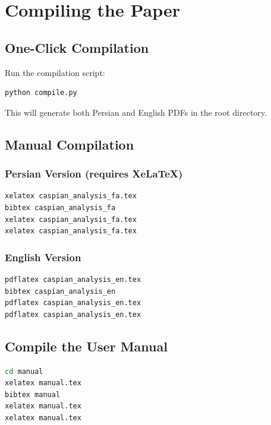 \documentclass[12pt,a4paper]{article}
\begin{document}
\section{Compiling the Paper}

\subsection{One-Click Compilation}
Run the compilation script:
\begin{lstlisting}[language=bash]
python compile.py
\end{lstlisting}
This will generate both Persian and English PDFs in the root directory.

\subsection{Manual Compilation}
\subsubsection{Persian Version (requires XeLaTeX)}
\begin{lstlisting}[language=bash]
xelatex caspian_analysis_fa.tex
bibtex caspian_analysis_fa
xelatex caspian_analysis_fa.tex
xelatex caspian_analysis_fa.tex
\end{lstlisting}

\subsubsection{English Version}
\begin{lstlisting}[language=bash]
pdflatex caspian_analysis_en.tex
bibtex caspian_analysis_en
pdflatex caspian_analysis_en.tex
pdflatex caspian_analysis_en.tex
\end{lstlisting}

\subsection{Compile the User Manual}
\begin{lstlisting}[language=bash]
cd manual
xelatex manual.tex
bibtex manual
xelatex manual.tex
xelatex manual.tex
\end{lstlisting}

\end{document}
